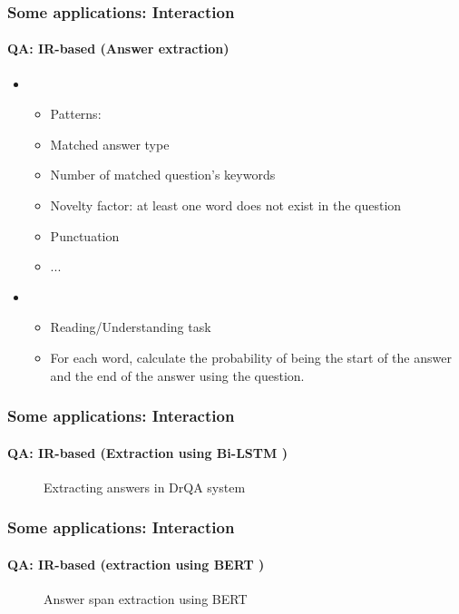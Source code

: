 \documentclass[xcolor=table]{beamer}
\begin{document}
\begin{frame}
	\frametitle{Some applications: Interaction}
	\framesubtitle{QA: IR-based (Answer extraction)}
	
	\begin{itemize}
		\item {}
		\begin{itemize}
			\item Patterns: 
			\item Matched answer type
			\item Number of matched question's keywords 
			\item Novelty factor: at least one word does not exist in the question
			\item Punctuation
			\item ...
		\end{itemize}
		\item {}
		\begin{itemize}
			\item Reading/Understanding task
			\item For each word, calculate the probability of being the start of the answer and the end of the answer using the question.
		\end{itemize}
	\end{itemize}
	
\end{frame}

\begin{frame}
	\frametitle{Some applications: Interaction}
	\framesubtitle{QA: IR-based (Extraction using Bi-LSTM \cite{2017-chen-al})}
	
	\vskip-6pt
	\begin{figure}
		\vskip-3pt
		\caption{Extracting answers in DrQA system \cite{2019-jurafsky-martin}}
	\end{figure}
	
\end{frame}

\begin{frame}
	\frametitle{Some applications: Interaction}
	\framesubtitle{QA: IR-based (extraction using BERT \cite{2018-devlin-al})}
	
	\begin{figure}
		\centering
		\caption{Answer span extraction using BERT \cite{2019-jurafsky-martin}}
	\end{figure}
	
\end{frame}
\end{document}
